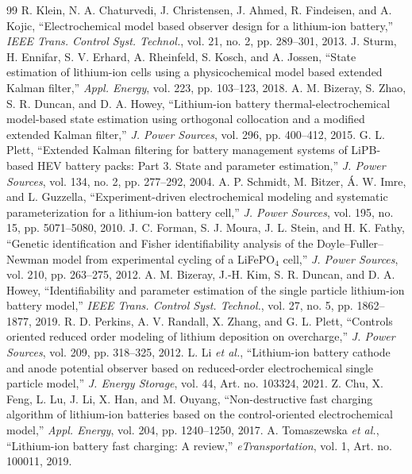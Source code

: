 \documentclass[journal]{IEEEtran}
\begin{document}
\begin{thebibliography}{99}
 R. Klein, N. A. Chaturvedi, J. Christensen, J. Ahmed, R. Findeisen, and A. Kojic, ``Electrochemical model based observer design for a lithium-ion battery,'' \emph{IEEE Trans. Control Syst. Technol.}, vol. 21, no. 2, pp. 289--301, 2013.
 J. Sturm, H. Ennifar, S. V. Erhard, A. Rheinfeld, S. Kosch, and A. Jossen, ``State estimation of lithium-ion cells using a physicochemical model based extended Kalman filter,'' \emph{Appl. Energy}, vol. 223, pp. 103--123, 2018.
 A. M. Bizeray, S. Zhao, S. R. Duncan, and D. A. Howey, ``Lithium-ion battery thermal-electrochemical model-based state estimation using orthogonal collocation and a modified extended Kalman filter,'' \emph{J. Power Sources}, vol. 296, pp. 400--412, 2015.
 G. L. Plett, ``Extended Kalman filtering for battery management systems of LiPB-based HEV battery packs: Part 3. State and parameter estimation,'' \emph{J. Power Sources}, vol. 134, no. 2, pp. 277--292, 2004.
 A. P. Schmidt, M. Bitzer, \'A. W. Imre, and L. Guzzella, ``Experiment-driven electrochemical modeling and systematic parameterization for a lithium-ion battery cell,'' \emph{J. Power Sources}, vol. 195, no. 15, pp. 5071--5080, 2010.
 J. C. Forman, S. J. Moura, J. L. Stein, and H. K. Fathy, ``Genetic identification and Fisher identifiability analysis of the Doyle--Fuller--Newman model from experimental cycling of a LiFePO$_4$ cell,'' \emph{J. Power Sources}, vol. 210, pp. 263--275, 2012.
 A. M. Bizeray, J.-H. Kim, S. R. Duncan, and D. A. Howey, ``Identifiability and parameter estimation of the single particle lithium-ion battery model,'' \emph{IEEE Trans. Control Syst. Technol.}, vol. 27, no. 5, pp. 1862--1877, 2019.
 R. D. Perkins, A. V. Randall, X. Zhang, and G. L. Plett, ``Controls oriented reduced order modeling of lithium deposition on overcharge,'' \emph{J. Power Sources}, vol. 209, pp. 318--325, 2012.
 L. Li \emph{et al.}, ``Lithium-ion battery cathode and anode potential observer based on reduced-order electrochemical single particle model,'' \emph{J. Energy Storage}, vol. 44, Art. no. 103324, 2021.
 Z. Chu, X. Feng, L. Lu, J. Li, X. Han, and M. Ouyang, ``Non-destructive fast charging algorithm of lithium-ion batteries based on the control-oriented electrochemical model,'' \emph{Appl. Energy}, vol. 204, pp. 1240--1250, 2017.
 A. Tomaszewska \emph{et al.}, ``Lithium-ion battery fast charging: A review,'' \emph{eTransportation}, vol. 1, Art. no. 100011, 2019.

\end{thebibliography}
\end{document}
